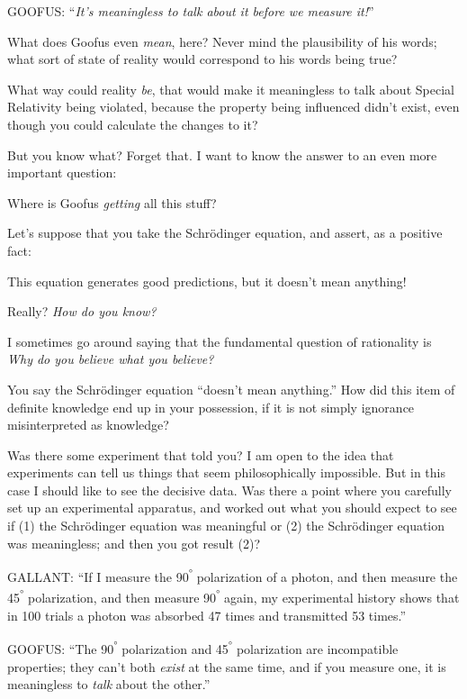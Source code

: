 {
 GOOFUS: ``\textit{It's
meaningless to talk about it before we measure
it!}''}

{
 What does Goofus even \textit{mean}, here? Never mind the
plausibility of his words; what sort of state of reality would
correspond to his words being true?}

{
 What way could reality \textit{be}, that would make it meaningless
to talk about Special Relativity being violated, because the property
being influenced didn't exist, even though you could
calculate the changes to it?}

{
 But you know what? Forget that. I want to know the answer to an
even more important question:}

{
 Where is Goofus \textit{getting} all this stuff?}

{
 Let's suppose that you take the Schrödinger
equation, and assert, as a positive fact:}

{
 This equation generates good predictions, but it
doesn't mean anything!}

{
 Really? \textit{How do you know?}}

{
 I sometimes go around saying that the fundamental question of
rationality is \textit{Why do you believe what you believe?}}

{
 You say the Schrödinger equation
``doesn't mean
anything.'' How did this item of definite knowledge
end up in your possession, if it is not simply ignorance misinterpreted
as knowledge?}

{
 Was there some experiment that told you? I am open to the idea
that experiments can tell us things that seem philosophically
impossible. But in this case I should like to see the decisive data.
Was there a point where you carefully set up an experimental apparatus,
and worked out what you should expect to see if (1) the Schrödinger
equation was meaningful or (2) the Schrödinger equation was
meaningless; and then you got result (2)?}

{
 GALLANT: ``If I measure the 90\textsuperscript{°}
polarization of a photon, and then measure the 45\textsuperscript{°}
polarization, and then measure 90\textsuperscript{°} again, my
experimental history shows that in 100 trials a photon was absorbed 47
times and transmitted 53 times.''}

{
 GOOFUS: ``The 90\textsuperscript{°} polarization
and 45\textsuperscript{°} polarization are incompatible properties;
they can't both \textit{exist} at the same time, and if
you measure one, it is meaningless to \textit{talk} about the
other.''}

